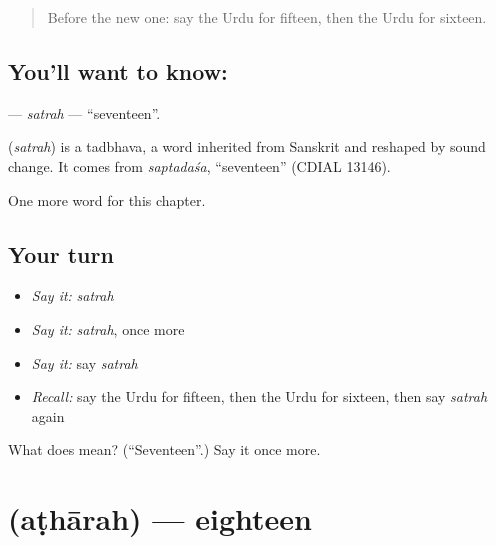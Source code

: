 \label{lesson:UR-C84-satrah}



\begin{quote}
Before the new one: say the Urdu for fifteen, then the Urdu for sixteen.
\end{quote}

\subsection*{You'll want to know: }
\textbf{} — \emph{satrah} — \textquotedblleft{}seventeen\textquotedblright{}.

\begin{cousinweb}
\textbf{} (\emph{satrah}) is a tadbhava, a word inherited from Sanskrit and reshaped by sound change. It comes from \emph{saptadaśa}, \textquotedblleft{}seventeen\textquotedblright{} (CDIAL 13146).
\end{cousinweb}

\begin{grammarlens}[title={What you've built}]
One more word for this chapter.
\end{grammarlens}

\subsection*{Your turn}
\begin{itemize}
\raggedright
  \item \emph{Say it:} \emph{satrah}
  \item \emph{Say it:} \emph{satrah}, once more
  \item \emph{Say it:} say \emph{satrah}
  \item \emph{Recall:} say the Urdu for fifteen, then the Urdu for sixteen, then say \emph{satrah} again
\end{itemize}

\begin{tcolorbox}[breakable,colback=teal!4,colframe=teal!35!black,title={Before you move on}]
What does  mean? (\textquotedblleft{}Seventeen\textquotedblright{}.) Say it once more.
\end{tcolorbox}
\section[\texorpdfstring{\ur{اٹھارہ} (aṭhārah)}{اٹھارہ (aṭhārah)}]{ (aṭhārah) — eighteen}

\label{lesson:UR-C84-atharah}



